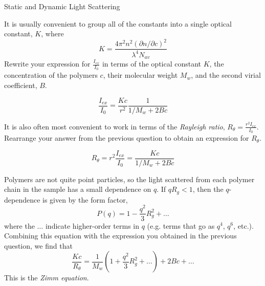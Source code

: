 \begin{activity}{Static and Dynamic Light Scattering}
\begin{ctqs}
	\question It is usually convenient to group all of the constants into a single optical constant, $K$, where
		\begin{equation*}
			K = \frac{4\pi^2 n^2 (\partial n / \partial c)^2}{\lambda^4 N_{av}}
		\end{equation*}
		Rewrite your expression for $\frac{I_{ex}}{I_0}$ in terms of the optical constant $K$, the concentration of the polymers $c$, their molecular weight $M_w$, and the second virial coefficient, $B$.
		
		\begin{solution}[1in]{}
			\begin{equation*}
				\frac{I_{ex}}{I_0} = \frac{Kc}{r^2} \frac{1}{1/M_w + 2Bc}
			\end{equation*}
		\end{solution}
	
	\question It is also often most convenient to work in terms of the \emph{Rayleigh ratio}, $R_\theta = \frac{r^2 I_{ex}}{I_0}$.  Rearrange your answer from the previous question to obtain an expression for $R_\theta$.
		
		\begin{solution}[0.75in]{}
			\begin{equation*}
				R_\theta = r^2 \frac{I_{ex}}{I_0} = \frac{Kc}{1/M_w + 2Bc }
			\end{equation*}
		\end{solution}
	
	
\end{ctqs}

\begin{infobox}

	Polymers are not quite point particles, so the light scattered from each polymer chain in the sample has a small dependence on $q$.  If $qR_g < 1$, then the $q$-dependence is given by the form factor,
	\begin{equation*}
		P(q) = 1 - \frac{q^2}{3}R_g^2 + \dots
	\end{equation*}
	where the $\dots$ indicate higher-order terms in $q$ (e.g. terms that go as $q^4$, $q^6$, etc.).	
	Combining this equation with the expression you obtained in the previous question, we find that
	\begin{equation*}
		\frac{Kc}{R_\theta} = \frac{1}{M_w}\left( 1 + \frac{q^2}{3} R_g^2 + \dots \right) + 2Bc + \dots
	\end{equation*}
	This is the \emph{Zimm equation}.
\end{infobox}

\begin{ctqs}
	

\end{ctqs}
\end{activity}
